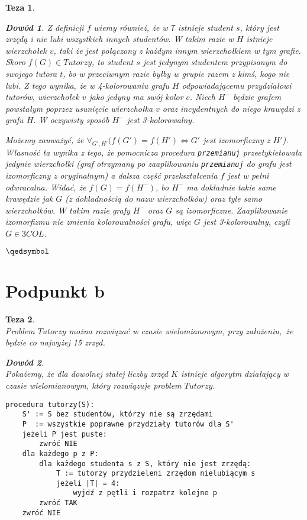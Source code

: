 \documentclass[12pt]{article}
\newtheorem*{theorem*}{Teza}
\newtheorem*{proof*}{Dowód}
\begin{document}
\begin{titlepage}
\begin{theorem*}
\begin{proof*}
Z definicji $f$ wiemy również, że w \texttt{T} istnieje student $s$, który jest \textit{zrzędą} i nie lubi wszystkich innych studentów. W takim razie w $H$ istnieje wierzchołek $v$, taki że jest połączony z każdym innym wierzchołkiem w tym grafie. Skoro $f(G) \in Tutorzy$, to student $s$ jest jedynym studentem przypisanym do swojego tutora $t$, bo w przeciwnym razie byłby w grupie razem z kimś, kogo nie lubi. Z tego wynika, że w 4-kolorowaniu grafu $H$ odpowiadającemu przydziałowi tutorów, wierzchołek $v$ jako jedyny ma swój kolor $c$. Niech $H^-$ będzie grafem powstałym poprzez usunięcie wierzchołka $v$ oraz incydentnych do niego krawędzi z grafu $H$. W oczywisty sposób $H^-$ jest 3-kolorowalny.

Możemy zauważyć, że $\forall_{G', H'}(f(G') = f(H') \Leftrightarrow G'$ jest 
izomorficzny z $H'$). Własność ta wynika z tego, że pomocnicza procedura 
\texttt{przemianuj} przeetykietowała jedynie wierzchołki (graf otrzymany po 
zaaplikowaniu \texttt{przemianuj} do grafu jest izomorficzny z oryginalnym) a 
dalsza część przekształcenia $f$ jest w pełni odwracalna. Widać, że $f(G) 
= f(H^-)$, bo $H^-$ ma dokładnie takie same krawędzie jak $G$ (z dokładnością 
do nazw wierzchołków) oraz tyle samo wierzchołków. W takim razie grafy $H^-$ oraz $G$ są izomorficzne. Zaaplikowanie izomorfizmu nie zmienia kolorowalności grafu, więc $G$ jest 3-kolorowalny, czyli $G \in 3COL$.
\begin{flushright}
    $\qedsymbol$
\end{flushright}

\end{proof*} \end{theorem*}

\hrulefill

\section{Podpunkt b}

\begin{theorem*}\,\\\normalfont
Problem $Tutorzy$ można rozwiązać w czasie wielomianowym, przy założeniu, że 
będzie co najwyżej 15 zrzęd.

\begin{proof*}\,\\\normalfont
Pokażemy, że dla dowolnej stałej liczby zrzęd $K$ istnieje algorytm działający 
w czasie wielomianowym, który rozwiązuje problem $Tutorzy$.

\begin{verbatim}
procedura tutorzy(S):
    S' := S bez studentów, którzy nie są zrzędami
    P  := wszystkie poprawne przydziały tutorów dla S'
    jeżeli P jest puste:
        zwróć NIE
    dla każdego p z P:
        dla każdego studenta s z S, który nie jest zrzędą:
            T := tutorzy przydzieleni zrzędom nielubiącym s
            jeżeli |T| = 4:
                wyjdź z pętli i rozpatrz kolejne p
        zwróć TAK
    zwróć NIE
\end{verbatim}


\end{proof*}
\end{theorem*}
\end{titlepage}
\end{document}
